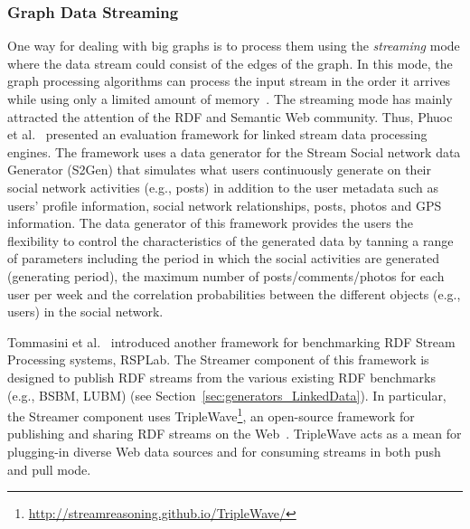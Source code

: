 \subsubsection{Graph Data Streaming}
\label{sec:generators_streaming}
One way for dealing with big graphs is to process them using the \emph{streaming} mode where the data stream could consist of the edges of the graph. In this mode, the graph processing algorithms can process the input stream in the order it arrives while using only a limited amount of memory~\cite{mcgregor2014graph}. The streaming mode has mainly  attracted the attention of the RDF and Semantic Web community. Thus, Phuoc et al.~\cite{le2012linked} presented an evaluation framework for linked stream data processing engines. The framework uses a data generator for the Stream Social network data Generator (S2Gen) that simulates what users continuously generate on their social network activities (e.g., posts) in addition to the  user metadata such as users' profile information, social network relationships, posts, photos and GPS information. The data generator of this framework provides the users the flexibility to control the characteristics of the generated data by tanning a range of parameters including the period in which the social activities are generated (generating period), the maximum number of posts/comments/photos for each user per week and the correlation probabilities between the different objects (e.g., users) in the social network.

Tommasini et al.~\cite{tommasini2017rsplab} introduced another framework for benchmarking RDF Stream Processing systems, RSPLab. The Streamer component of this framework is designed to publish RDF streams from the various existing RDF benchmarks (e.g., BSBM, LUBM) (see Section~\ref{sec:generators_LinkedData}). In particular, the Streamer  component uses TripleWave\footnote{\url{http://streamreasoning.github.io/TripleWave/}}, an open-source framework for publishing and sharing RDF streams on the Web~\cite{mauri2016triplewave}.   TripleWave acts as a mean for plugging-in diverse Web data sources and for consuming streams in both push and pull mode.

